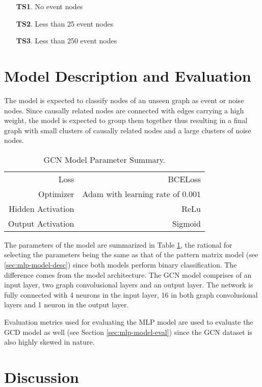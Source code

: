 \begin{enumerate}
\item[\textbf{TS1}.] No event nodes
\item[\textbf{TS2}.] Less than 25 event nodes
\item[\textbf{TS3}.] Less than 250 event nodes
\end{enumerate}

\section{Model Description and Evaluation}
\label{sec:gcn-model-desc-eval}

The model is expected to classify nodes of an unseen graph as event or
noise nodes. Since causally related nodes are connected with edges
carrying a high weight, the model is expected to group them together
thus resulting in a final graph with small clusters of causally
related nodes and a large clusters of noise nodes.

\begin{table}[t]
  \centering
  \begin{tabular}{rr}
    \hline
    Loss & BCELoss \\
    Optimizer & Adam with learning rate of $0.001$ \\
    Hidden Activation & ReLu \\
    Output Activation & Sigmoid \\
    \hline
  \end{tabular}
  \caption{GCN Model Parameter Summary.}
  \label{tab:gcn-model-param}
\end{table}

The parameters of the model are summarized in Table
\ref{tab:gcn-model-param}, the rational for selecting the parameters
being the same as that of the pattern matrix model (see
\ref{sec:mlp-model-desc}) since both models perform binary
classification. The difference comes from the model architecture. The
GCN model comprises of an input layer, two graph convolusional layers
and an output layer. The network is fully connected with 4 neurons in
the input layer, 16 in both graph convolusional layers and 1 neuron in
the output layer.

Evaluation metrics used for evaluating the MLP model are used to
evaluate the GCD model as well (see Section \ref{sec:mlp-model-eval})
since the GCN dataset is also highly skewed in nature.

\section{Discussion}
\label{sec[gcd-disc]}


